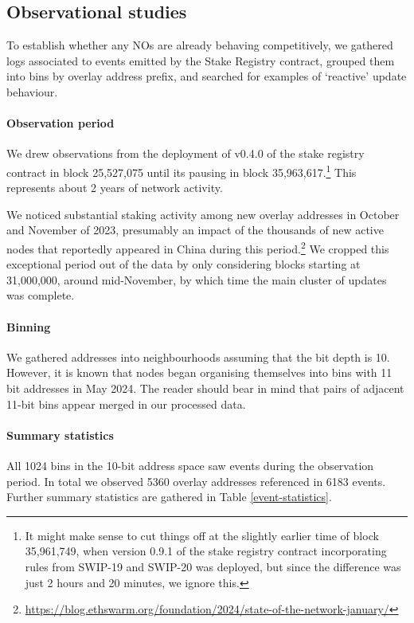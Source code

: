 \subsection*{Observational studies}

To establish whether any NOs are already behaving competitively, we gathered logs associated to  events emitted by the Stake Registry contract, grouped them into bins by overlay address prefix, and searched for examples of `reactive' update behaviour.

\paragraph{Observation period}
We drew observations from the deployment of v0.4.0 of the stake registry contract in block 25,527,075 until its pausing in block 35,963,617.\footnote{It might make sense to cut things off at the slightly earlier time of block 35,961,749, when version 0.9.1 of the stake registry contract incorporating rules from SWIP-19 and SWIP-20 was deployed, but since the difference was just 2 hours and 20 minutes, we ignore this.} This represents about 2 years of network activity.

We noticed substantial staking activity among new overlay addresses in October and November of 2023, presumably an impact of the thousands of new active nodes that reportedly appeared in China during this period.\footnote{\url{https://blog.ethswarm.org/foundation/2024/state-of-the-network-january/}}
%
We cropped this exceptional period out of the data by only considering blocks starting at 31,000,000, around mid-November, by which time the main cluster of updates was complete.

\paragraph{Binning} We gathered addresses into neighbourhoods assuming that the bit depth is 10.
%
However, it is known that nodes began organising themselves into bins with 11 bit addresses in May 2024.
%
The reader should bear in mind that pairs of adjacent 11-bit bins appear merged in our processed data.

\paragraph{Summary statistics}
All 1024 bins in the 10-bit address space saw events during the observation period.
%
In total we observed 5360 overlay addresses referenced in 6183 events. 
%
Further summary statistics are gathered in Table \ref{event-statistics}.

